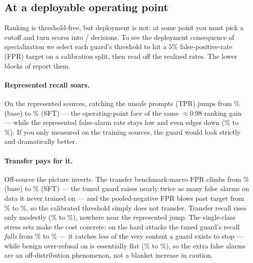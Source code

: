 \subsection{At a deployable operating point}
\label{sec:actI-op}

Ranking is threshold-free, but deployment is not: at some point you must pick a cutoff and turn scores
into / decisions. To see the deployment consequence of specialization we select
each guard's threshold to hit a $5\%$ false-positive-rate (FPR) target on a calibration split, then read
off the realized rates. The lower blocks of  report them.

\paragraph{Represented recall soars.} On the represented sources, catching the unsafe prompts (TPR)
jumps from \RepBaseTPRPct\% (base) to \RepSFTTPRPct\% (SFT) --- the operating-point face of the same
$\approx 0.98$ ranking gain --- while the represented false-alarm rate stays low and even edges down
(\RepBaseFPRPct\% to \RepSFTFPRPct\%). If you only measured on the training sources, the guard would
look strictly and dramatically better.

\paragraph{Transfer pays for it.} Off-source the picture inverts. The transfer benchmark-macro FPR
climbs from \TransferBaseFPRPct\% (base) to \TransferSFTFPRPct\% (SFT) --- the tuned guard raises nearly
twice as many false alarms on data it never trained on --- and the pooled-negative FPR blows past target
from \TransferBasePooledFPRPct\% to \TransferSFTPooledFPRPct\%, so the calibrated threshold simply does
not transfer. Transfer recall rises only modestly (\TransferBaseTPRPct\% to \TransferSFTTPRPct\%),
nowhere near the represented jump. The single-class stress sets make the cost concrete: on the hard
 attacks the tuned guard's recall \emph{falls} from \HarmBenchBaseRecallPct\% to
\HarmBenchSFTRecallPct\% --- it catches less of the very content a guard exists to stop --- while
benign over-refusal on  is essentially flat (\ORBenchBaseFPRPct\% to \ORBenchSFTFPRPct\%),
so the extra false alarms are an off-distribution phenomenon, not a blanket increase in caution.

\begin{table}[htbp]\centering\small\setlength{\tabcolsep}{6pt}
\caption{Act I --- per-benchmark paired deltas (upper) and the calibration-targeted $5\%$ FPR operating
point plus single-class stress diagnostics (lower). Generated from the lock-bound scores.}
\label{tab:sensitivity}

\end{table}

